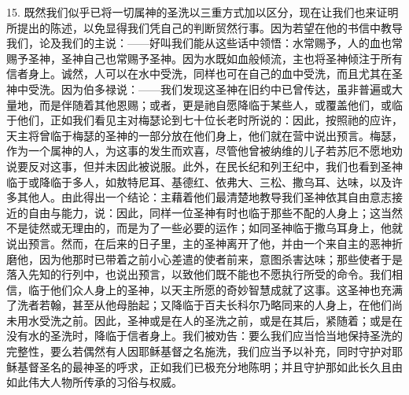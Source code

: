 15. 既然我们似乎已将一切属神的圣洗以三重方式加以区分，现在让我们也来证明所提出的陈述，以免显得我们凭自己的判断贸然行事。因为若望在他的书信中教导我们，论及我们的主说：——好叫我们能从这些话中领悟：水常赐予，人的血也常赐予圣神，圣神自己也常赐予圣神。因为水既如血般倾流，主也将圣神倾注于所有信者身上。诚然，人可以在水中受洗，同样也可在自己的血中受洗，而且尤其在圣神中受洗。因为伯多禄说：——我们发现这圣神在旧约中已曾传达，虽非普遍或大量地，而是伴随着其他恩赐；或者，更是祂自愿降临于某些人，或覆盖他们，或临于他们，正如我们看见主对梅瑟论到七十位长老时所说的：因此，按照祂的应许，天主将曾临于梅瑟的圣神的一部分放在他们身上，他们就在营中说出预言。梅瑟，作为一个属神的人，为这事的发生而欢喜，尽管他曾被纳维的儿子若苏厄不愿地劝说要反对这事，但并未因此被说服。此外，在民长纪和列王纪中，我们也看到圣神临于或降临于多人，如敖特尼耳、基德红、依弗大、三松、撒乌耳、达味，以及许多其他人。由此得出一个结论：主藉着他们最清楚地教导我们圣神依其自由意志接近的自由与能力，说：因此，同样一位圣神有时也临于那些不配的人身上；这当然不是徒然或无理由的，而是为了一些必要的运作；如同圣神临于撒乌耳身上，他就说出预言。然而，在后来的日子里，主的圣神离开了他，并由一个来自主的恶神折磨他，因为他那时已带着之前小心差遣的使者前来，意图杀害达味；那些使者于是落入先知的行列中，也说出预言，以致他们既不能也不愿执行所受的命令。我们相信，临于他们众人身上的圣神，以天主所愿的奇妙智慧成就了这事。这圣神也充满了洗者若翰，甚至从他母胎起；又降临于百夫长科尔乃略同来的人身上，在他们尚未用水受洗之前。因此，圣神或是在人的圣洗之前，或是在其后，紧随着；或是在没有水的圣洗时，降临于信者身上。我们被劝告：要么我们应当恰当地保持圣洗的完整性，要么若偶然有人因耶稣基督之名施洗，我们应当予以补充，同时守护对耶稣基督圣名的最神圣的呼求，正如我们已极充分地陈明；并且守护那如此长久且由如此伟大人物所传承的习俗与权威。\par

